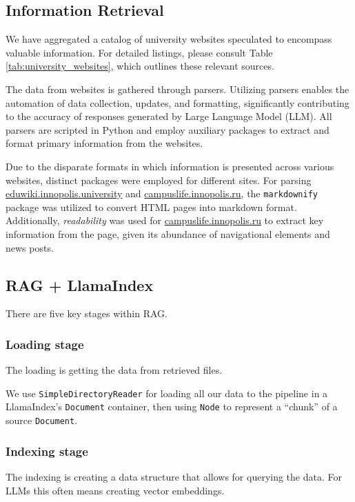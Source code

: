 \documentclass[conference, 11pt]{IEEEtran}
\begin{document}
\subsection{Information Retrieval}

We have aggregated a catalog of university websites speculated to encompass valuable information. For detailed listings, please consult Table \ref{tab:university_websites}, which outlines these relevant sources.

The data from websites is gathered through parsers. Utilizing parsers enables the automation of data collection, updates, and formatting, significantly contributing to the accuracy of responses generated by Large Language Model (LLM). All parsers are scripted in Python and employ auxiliary packages to extract and format primary information from the websites.

Due to the disparate formats in which information is presented across various websites, distinct packages were employed for different sites. For parsing \href{https://eduwiki.innopolis.university/}{eduwiki.innopolis.university} and \href{https://campuslife.innopolis.ru/}{campuslife.innopolis.ru}, the \texttt{markdownify} package was utilized to convert HTML pages into markdown format. Additionally, \textit{readability} was used for \href{https://campuslife.innopolis.ru/}{campuslife.innopolis.ru} to extract key information from the page, given its abundance of navigational elements and news posts.

\subsection{RAG + LlamaIndex}
There are five key stages within RAG.
\subsubsection{Loading stage}
The loading is getting the data from retrieved files. 

We use \texttt{SimpleDirectoryReader} for loading all our data to the pipeline in a LlamaIndex's \texttt{Document} container, then using \texttt{Node} to represent a ``chunk'' of a source \texttt{Document}.

\subsubsection{Indexing stage}
The indexing is creating a data structure that allows for querying the data. For LLMs this often means creating vector embeddings.
\end{document}
